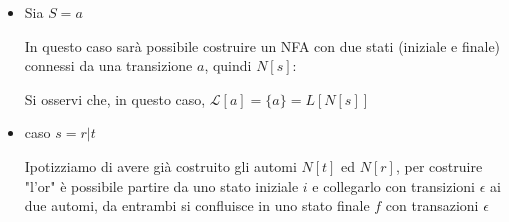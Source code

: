 {\begin{itemize}
\begin{center}
        \end{center}
        Si osservi che, in questo caso, $\mathcal{L}[\epsilon] = \{\epsilon\}=L[N[s]]$
        \item Sia $S = a$
        
        In questo caso sarà possibile costruire un NFA con due stati (iniziale e finale) connessi da una transizione $a$, quindi $N[s]$:

        \begin{center}
        \end{center}

        Si osservi che, in questo caso, $\mathcal{L}[a] = \{a\}=L[N[s]]$
        \item caso $s= r|t$
        
        Ipotizziamo di avere già costruito gli automi $N[t]$ ed $N[r]$, per costruire "l'or" è possibile partire da uno stato iniziale $i$ e collegarlo con transizioni $\epsilon$ ai due automi, da entrambi si confluisce in uno stato finale $f$ con transazioni $\epsilon$
        
        \begin{center}
\end{center}
\end{itemize}}
